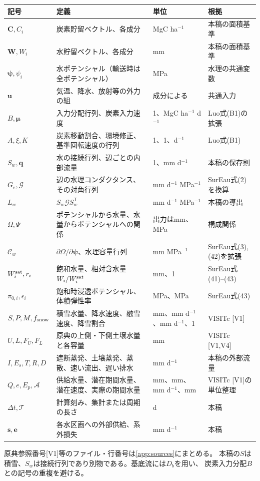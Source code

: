 \documentclass[a4paper,11pt]{ltjsarticle}
\newcommand{\trans}{^{\mathsf T}}
\begin{document}
\begin{longtable}{p{.20\linewidth}p{.34\linewidth}p{.18\linewidth}p{.20\linewidth}}
\toprule 記号 & 定義 & 単位 & 根拠\\\midrule\endhead
$\bm C,C_i$ & 炭素貯留ベクトル、各成分 & MgC ha$^{-1}$ & 本稿の面積基準\\
$\bm W,W_i$ & 水貯留ベクトル、各成分 & mm & 本稿の面積基準\\
$\bm\psi,\psi_i$ & 水ポテンシャル（輸送時は全ポテンシャル） & MPa & 水理の共通変数\\
$\bm u$ & 気温、降水、放射等の外力の組 & 成分による & 共通入力\\
$B,\bm\mu$ & 入力分配行列、炭素入力速度 & 1、MgC ha$^{-1}$ d$^{-1}$ & Luo式(B1)の拡張\\
$A,\xi,K$ & 炭素移動割合、環境修正、基準回転速度の行列 & 1、1、d$^{-1}$ & Luo式(B1)\\
$S_w,\bm q$ & 水の接続行列、辺ごとの内部流量 & 1、mm d$^{-1}$ & 本稿の保存則\\
$G_e,\mathcal G$ & 辺の水理コンダクタンス、その対角行列 & mm d$^{-1}$ MPa$^{-1}$ & SurEau式(2)を換算\\
$L_w$ & $S_w\mathcal G S_w\trans$ & mm d$^{-1}$ MPa$^{-1}$ & 本稿の導出\\
$\Omega,\Psi$ & ポテンシャルから水量、水量からポテンシャルへの関係 & 出力はmm、MPa & 構成関係\\
$\mathcal C_w$ & $\partial\Omega/\partial\bm\psi$、水理容量行列 & mm MPa$^{-1}$ & SurEau式(3),(42)を拡張\\
$W_i^{\rm sat},r_i$ & 飽和水量、相対含水量$W_i/W_i^{\rm sat}$ & mm、1 & SurEau式(41)--(43)\\
$\pi_{0,i},\epsilon_i$ & 飽和時浸透ポテンシャル、体積弾性率 & MPa、MPa & SurEau式(43)\\
$S,P,M,f_{\rm snow}$ & 積雪水量、降水速度、融雪速度、降雪割合 & mm、mm d$^{-1}$、mm d$^{-1}$、1 & VISITc [V1]\\
$U,L,F_U,F_L$ & 原典の上側・下側土壌水量と各容量 & mm & VISITc [V1,V4]\\
$I,E_s,T,R,D$ & 遮断蒸発、土壌蒸発、蒸散、速い流出、遅い排水 & mm d$^{-1}$ & 本稿の外部流量\\
$Q,e,E_p,\mathcal A$ & 供給水量、潜在期間水量、潜在速度、実際の期間水量 & mm、mm、mm d$^{-1}$、mm & VISITc [V1]の単位整理\\
$\Delta t,\mathcal T$ & 計算刻み、集計または周期の長さ & d & 本稿\\
$\bm s,\bm e$ & 各水区画への外部供給、系外損失 & mm d$^{-1}$ & 本稿\\
\bottomrule
\end{longtable}
原典参照番号[V1]等のファイル・行番号は\ref{app:sources}にまとめる。
本稿の$S$は積雪、$S_w$は接続行列であり別物である。基底流には$D_b$を用い、
炭素入力分配$B$との記号の重複を避ける。
\end{document}
